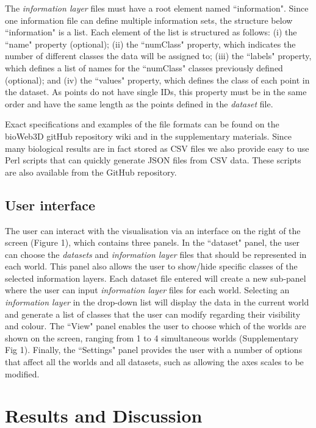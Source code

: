 \documentclass[10pt]{bmc_article}
\newenvironment{bmcformat}{\baselineskip20pt\sloppy\setboolean{publ}{false}}{\baselineskip20pt\sloppy}
\begin{document}
\begin{bmcformat}
The {\it{information layer}} files must have a root element named  ``information". Since one information file can define multiple information sets, the structure below ``information" is a list. Each element of the list is structured as follows: (i) the ``name" property (optional); (ii) the ``numClass" property, which indicates the number of different classes the data will be assigned to; (iii) the ``labels" property, which defines a list of names for the ``numClass" classes previously defined (optional); and (iv) the ``values" property, which defines the class of each point in the dataset. As points do not have single IDs, this property must be in the same order and have the same length as the points defined in the {\it{dataset}} file.

Exact specifications and examples of the file formats can be found on the bioWeb3D gitHub repository wiki and in the supplementary materials. Since many biological results are in fact stored as CSV files we also provide easy to use Perl scripts that can quickly generate JSON files from CSV data. These scripts are also available from the GitHub repository.


\subsection{User interface}
The user can interact with the visualisation via an interface on the right of the screen (Figure 1), which contains three panels. In the ``dataset" panel, the user can choose the {\it{datasets}} and {\it{information layer}} files that should be represented in each world. This panel also allows the user to show/hide specific classes of the selected information layers. Each dataset file entered will create a new sub-panel where the user can input {\it{information layer}} files for each world. Selecting an {\it{information layer}} in the drop-down list will display the data in the current world and generate a list of classes that the user can modify regarding their visibility and colour. The ``View" panel enables the user to choose which of the worlds are shown on the screen, ranging from 1 to 4 simultaneous worlds (Supplementary Fig 1). Finally, the ``Settings" panel provides the user with a number of options that affect all the worlds and all datasets, such as allowing the axes scales to be modified.


\section{Results and Discussion}

\end{bmcformat}
\end{document}
